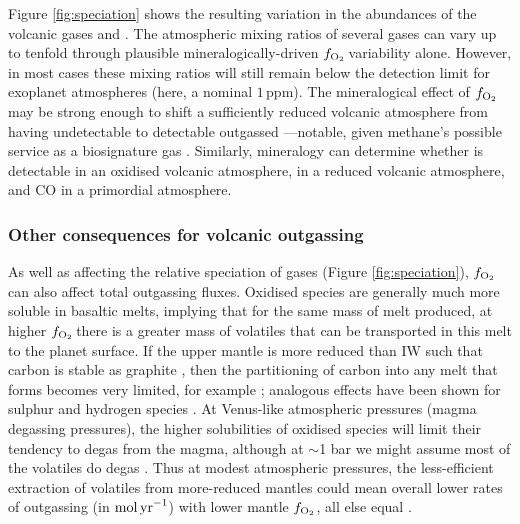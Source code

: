 \documentclass[fleqn,usenatbib,twocolumn]{mnras}
\newcommand{\fo}{$f_{\ce{O2}}$}
\begin{document}
Figure  \ref{fig:speciation} shows the resulting variation in the abundances of the volcanic gases  and . The atmospheric mixing ratios of several gases can vary up to tenfold through plausible mineralogically-driven \fo\,variability alone. However, in most cases these mixing ratios will still remain below the detection limit for exoplanet atmospheres (here, a nominal $1\,\text{ppm}$). The mineralogical effect of \fo\,may be strong enough to shift a sufficiently reduced volcanic atmosphere from having undetectable to detectable outgassed ---notable, given methane's possible service as a biosignature gas \citep[e.g.,][]{wogan_abundant_2020}. Similarly, mineralogy can determine whether  is detectable in an oxidised volcanic atmosphere,  in a reduced volcanic atmosphere, and CO in a primordial atmosphere.

\subsubsection{Other consequences for volcanic outgassing}

As well as affecting the relative speciation of gases (Figure \ref{fig:speciation}), \fo\,can also affect total outgassing fluxes. Oxidised species are generally much more soluble in basaltic melts, implying that for the same mass of melt produced, at higher \fo\,there is a greater mass of volatiles that can be transported in this melt to the planet surface. If the upper mantle is more reduced than IW such that carbon is stable as graphite \citep{stagno_carbon_2010}, then the partitioning of carbon into any melt that forms becomes very limited, for example \citep{holloway_high-pressure_1992, holloway_graphite-melt_1998, grott_volcanic_2011, wetzel_degassing_2013, armstrong_speciation_2015, li_carbon_2017}; analogous effects have been shown for sulphur \citep{jugo_sulfur_2009} and hydrogen species \citep{hirschmann_solubility_2012}. At Venus-like atmospheric pressures (magma degassing pressures), the higher solubilities of oxidised species will limit their tendency to degas from the magma, although at $\sim$1 bar we might assume most of the volatiles do degas \citep{gaillard_theoretical_2014}. Thus at modest atmospheric pressures, the less-efficient extraction of volatiles from more-reduced mantles could mean overall lower rates of outgassing (in ${\rm mol\,yr}^{-1}$) with lower mantle \fo, all else equal \citep{guimond_low_2021}.
\end{document}
